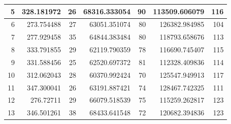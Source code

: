 \begin{table}
\begin{adjustwidth}{}{}
{{\begin{tabular}{|r|r|r|r|r|r|r|}
	\hline
	5                                          & 328.181972                   & 26                                    & 68316.333054                   & 90                                    & 113509.606079                & 116                                    \\ 
	\hline
	6                                          & 273.754488                   & 27                                    & 63051.351074                   & 80                                    & 126382.984985                & 104                                    \\ 
	\hline
	7                                          & 277.929458                   & 35                                    & 64844.383484                   & 80                                    & 118793.658676                & 113                                    \\ 
	\hline
	8                                          & 333.791855                   & 29                                    & 62119.790359                   & 78                                    & 116690.745407                & 115                                    \\ 
	\hline
	9                                          & 331.588456                   & 25                                    & 62520.697372                   & 81                                    & 112328.409836                & 114                                    \\ 
	\hline
	10                                         & 312.062043                   & 28                                    & 60370.992424                   & 70                                    & 125547.949913                & 117                                    \\ 
	\hline
	11                                         & 347.300041                   & 26                                    & 63191.887421                   & 74                                    & 128467.742325                & 111                                    \\ 
	\hline
	12                                         & 276.72711                    & 29                                    & 66079.518539                   & 75                                    & 115259.262817                & 123                                    \\ 
	\hline
	13                                         & 346.501261                   & 38                                    & 68433.641548                   & 72                                    & 120682.394836                & 123                                    \\ 

\end{tabular}}}
\end{adjustwidth}
\end{table}
